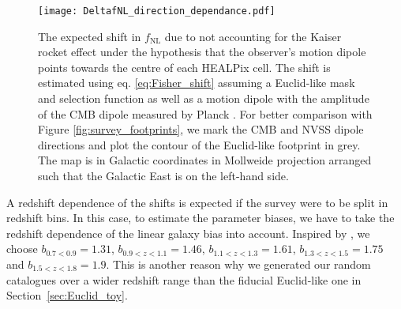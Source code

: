 \documentclass[a4paper,11pt]{article}
\begin{document}
\begin{figure}
    \centering
    \texttt{[image: DeltafNL\_direction\_dependance.pdf]}
    \caption{The expected shift in $f_\mathrm{NL}$ due to not accounting for the Kaiser rocket effect under the hypothesis that the observer's motion dipole points towards the centre of each HEALPix cell. The shift is estimated using eq. \eqref{eq:Fisher_shift} assuming a Euclid-like mask and selection function as well as a motion dipole with the amplitude of the CMB dipole measured by Planck \cite{Akrami:2018vks}. For better comparison with Figure \ref{fig:survey_footprints}, we mark the CMB and NVSS dipole directions and plot the contour of the Euclid-like footprint in grey. The map is in Galactic coordinates in Mollweide projection arranged such that the Galactic East is on the left-hand side.}
    \label{fig:DeltafNL_map}
\end{figure}


A redshift dependence of the shifts is expected if the survey were to be split in redshift bins.
In this case, to estimate the parameter biases, we have to take the redshift dependence of the linear galaxy bias into account. Inspired by \cite{Blanchard:2019oqi}, we choose $b_{0.7 < 0.9} = 1.31$, $b_{0.9<z<1.1}=1.46$, $b_{1.1<z<1.3}=1.61$, $b_{1.3<z<1.5}=1.75$ and $b_{1.5<z<1.8}=1.9$. This is another reason why we generated our random catalogues over a wider  redshift range than the fiducial Euclid-like one in Section~\ref{sec:Euclid_toy}.
\end{document}
